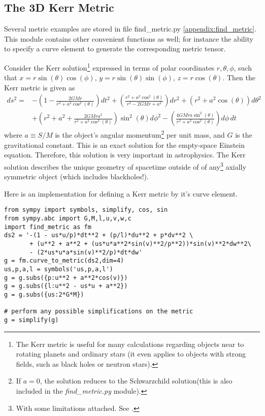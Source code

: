 \documentclass[main.tex]{subfiles}
\begin{document}
\subsection{The 3D Kerr Metric}
Several metric examples are stored in file find\_metric.py \ref{appendix:find_metric}.
This module contains other convenient functions as well; for instance the ability
to specify a curve element to generate the corresponding metric tensor.

Consider the Kerr solution\footnote{The Kerr metric is useful for many calculations 
regarding objects near to rotating planets and ordinary stars (it even applies to 
objects with strong fields, such as black holes or neutron stars)\cite{Moo10}.}
expressed in terms of polar coordinates $r,\theta,\phi$, such that $x = r\sin(\theta)
\cos(\phi)$, $y = r\sin(\theta)\sin(\phi)$, $z = r\cos(\theta)$. Then the Kerr metric
is given as
\begin{align*}
ds^2 = &-\left(1 - \frac{2GMr}{r^2+a^2\cos^2(\theta)}\right) dt^2 +
	      \left(\frac{r^2+a^2\cos^2(\theta)}{r^2-2GMr+a^2}\right) dr^2 +
		  \left(r^2+a^2\cos(\theta)\right) d\theta^2\\ 
		&+
		  \left(r^2+a^2+\frac{2GMra^2}{r^2+a^2\cos^2(\theta)}\right)\sin^2(\theta) d\phi^2 -
		  \left(\frac{4GMra\sin^2(\theta)}{r^2+a^2\cos^2(\theta)}\right) d\phi\, dt
\end{align*}
where $a \equiv S/M$ is the object's angular momentum\footnote{If $a=0$, the solution
reduces to the Schwarzchild solution(this is also included in the \emph{find\_metric.py} 
module).} per unit mass, and $G$ is the gravitational constant. This is an exact solution 
for the empty-space Einstein equation. Therefore, this solution is very important in
astrophysics. The Kerr solution describes the unique geometry of spacetime outside of
of any\footnote{With some limitations attached. See \cite{Moo10}.} axially symmetric object
(which includes blackholes!).

Here is an implementation for defining a Kerr metric by it's curve element.
\lstset{style=IPython}
\begin{lstlisting}
from sympy import symbols, simplify, cos, sin
from sympy.abc import G,M,l,u,v,w,c
import find_metric as fm
ds2 = '-(1 - us*u/p)*dt**2 + (p/l)*du**2 + p*dv**2 \
       + (u**2 + a**2 + (us*u*a**2*sin(v)**2/p**2))*sin(v)**2*dw**2\
       - (2*us*u*a*sin(v)**2/p)*dt*dw'
g = fm.curve_to_metric(ds2,dim=4)
us,p,a,l = symbols('us,p,a,l')
g = g.subs({p:u**2 + a**2*cos(v)})
g = g.subs({l:u**2 - us*u + a**2})
g = g.subs({us:2*G*M})

# perform any possible simplifications on the metric
g = simplify(g)
\end{lstlisting}
\end{document}
